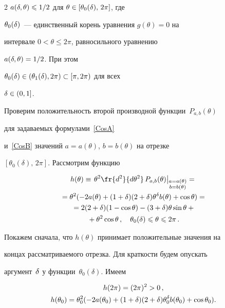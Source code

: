\begin{multicols}{2}
${a(\delta,\theta)\leqslant1/2}$ для ${\theta\in[\theta_0(\delta),\,2\pi]}$, где

$\theta_0(\delta)$~--- единственный корень уравнения ${g(\theta)=0}$ на

интервале ${0<\theta\le2\pi}$, равносильного уравнению

$a(\delta,\theta)=1/2$. При этом

$\theta_0(\delta)\in(\theta_1(\delta),2\pi)\subset[\pi,2\pi)$ для всех

$\delta\in(0,1]$.



Проверим положительность второй производной функции~$P_{a,b}(\theta)$

для задаваемых формулами~\eqref{CosA}

и~\eqref{CosB} значений ${a=a(\theta)}$, ${b=b(\theta)}$ на отрезке

$[\theta_0(\delta),\,2\pi]$. Рассмотрим функцию

\begin{multline*}

h(\theta)\equiv\left.

\theta^2\fr{d^2}{d\theta^2}\,P_{a,b}(\theta)\right\vert_{\substack{{a=a(\theta)}\\ {b=b(\theta)}}} ={}\\

 {}=

\theta^2(-2a(\theta)+(1+\d)(2+\d)\theta^{\d}b(\theta)+\cos \theta)={}\\

{}=2(2+\d)(1-\cos\theta)-

(3+\d)\theta\sin\theta+{}\\

{}+\theta^2\cos\theta\,,\quad

\theta_0(\delta)\le\theta\le 2\pi\,.

\end{multline*}

Покажем сначала, что $h(\theta)$ принимает положительные значения на

концах рассматриваемого отрезка. Для краткости будем опускать

аргумент~$\delta$ у функции~$\theta_0(\delta)$. Имеем

\begin{gather*}

h(2\pi)=(2\pi)^2>0\,,\\

h(\theta_0)= \theta_0^2(-2a(\theta_0)+

(1+\d)(2+\d)\theta_0^{\d}b(\theta_0)+\cos\theta_0).


\end{gather*}
\end{multicols}
